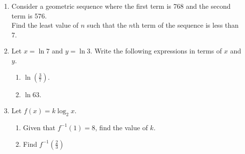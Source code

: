 \documentclass[12pt, oneside]{article}
\begin{document}
\begin{enumerate}
\item Consider a geometric sequence where the first term is 768 and the second term is 576.\\
Find the least value of $n$ such that the $n$th term of the sequence is less than 7.
    \begin{flushright}[6]\end{flushright}

\item Let $x=\ln 7$ and $y= \ln 3$. Write the following expressions in terms of $x$ and $y$.
\begin{enumerate}
    \item $\ln \left( \frac{3}{7} \right)$.
        \begin{flushright}[2]\end{flushright}
    \item $\ln 63$.
        \begin{flushright}[4]\end{flushright}
\end{enumerate}


\item Let $f(x)= k \log_2 x$.
\begin{enumerate}
    \item Given that $f^{-1}(1) = 8$, find the value of $k$.
        \begin{flushright}[3]\end{flushright}
    \item Find $f^{-1}(\frac{2}{3})$
        \begin{flushright}[4]\end{flushright}
\end{enumerate}



\end{enumerate}
\end{document}
